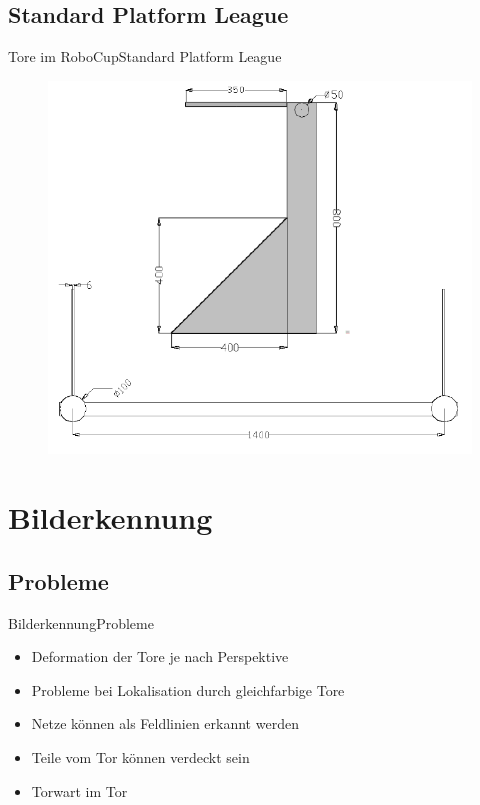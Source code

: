 \documentclass{beamer}
\begin{document}
\subsection{Standard Platform League}
\begin{frame}{Tore im RoboCup}{Standard Platform League}
\begin{figure}[htp]
\centering
\includegraphics[scale=0.4]{spl-goal.png}
\end{figure}
\end{frame}

\section{Bilderkennung}
\subsection{Probleme}
\begin{frame}{Bilderkennung}{Probleme}
\begin{itemize}
    \item Deformation der Tore je nach Perspektive
    \item Probleme bei Lokalisation durch gleichfarbige Tore
    \item Netze können als Feldlinien erkannt werden
    \item Teile vom Tor können verdeckt sein
    \item Torwart im Tor
\end{itemize}
\end{frame}
\end{document}
